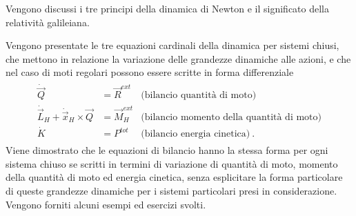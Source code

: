 \documentclass[letterpaper,10pt,italian]{jupyterBook}
\begin{document}
\sphinxAtStartPar
{} Vengono discussi i tre principi della dinamica di Newton e il significato della relatività galileiana.

\sphinxAtStartPar
{} Vengono presentate le tre equazioni cardinali della dinamica per sistemi chiusi, che mettono in relazione la variazione delle grandezze dinamiche alle azioni, e che nel caso di moti regolari possono essere scritte in forma differenziale
\begin{equation*}
\begin{split}\begin{aligned}
 \dot{\vec{Q}} & = \vec{R}^{ext} & \text{(bilancio quantità di moto)} \\
 \dot{\vec{L}}_H + \dot{\vec{x}}_H \times \vec{Q} & = \vec{M}_H^{ext} & \text{(bilancio momento della quantità di moto)} \\
 \dot{K} & = P^{tot} & \text{(bilancio energia cinetica)} \ .
\end{aligned}\end{split}
\end{equation*}
\sphinxAtStartPar
Viene dimostrato che le equazioni di bilancio hanno la stessa forma per ogni sistema chiuso se scritti in termini di variazione di quantità di moto, momento della quantità di moto ed energia cinetica, senza esplicitare la forma particolare di queste grandezze dinamiche per i sistemi particolari presi in considerazione. Vengono forniti alcuni esempi ed esercizi svolti.
\end{document}
